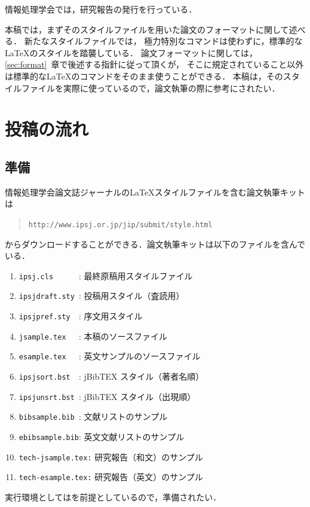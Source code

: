 \documentclass[submit,techrep,noauthor]{ipsj-lualatex}
\def\|{\verb|}
\begin{document}
情報処理学会では，研究報告の発行を行っている．

本稿では，まずそのスタイルファイルを用いた論文のフォーマットに関して述べる．
新たなスタイルファイルでは，
極力特別なコマンドは使わずに，標準的な\LaTeX のスタイルを踏襲している．
論文フォーマットに関しては，\ref{sec:format}~章で後述する指針に従って頂くが，
そこに規定されていること以外は標準的な\LaTeX のコマンドをそのまま使うことができる．
本稿は，そのスタイルファイルを実際に使っているので，論文執筆の際に参考にされたい．




%2
\section{投稿の流れ}


%2.1
\subsection{準備}

情報処理学会論文誌ジャーナルの\LaTeX スタイルファイルを含む論文執筆キットは
\begin{quote}
\small
\|http://www.ipsj.or.jp/jip/submit/style.html|
\end{quote}
からダウンロードすることができる．論文執筆キットは以下のファイルを含んで
いる．
\begin{enumerate}
\item \|ipsj.cls      |: 最終原稿用スタイルファイル
\item \|ipsjdraft.sty |: 投稿用スタイル（査読用）
\item \|ipsjpref.sty  |: 序文用スタイル
\item \|jsample.tex   |: 本稿のソースファイル
\item \|esample.tex   |: 英文サンプルのソースファイル
\item \|ipsjsort.bst  |: jBibTEX スタイル（著者名順）
\item \|ipsjunsrt.bst |: jBibTEX スタイル（出現順）
\item \|bibsample.bib |: 文献リストのサンプル
\item \|ebibsample.bib|: 英文文献リストのサンプル
\item \|tech-jsample.tex:| 研究報告（和文）のサンプル
\item \|tech-esample.tex:| 研究報告（英文）のサンプル
\end{enumerate}
実行環境としては\LaTeXe を前提としているので，準備されたい．
\end{document}
